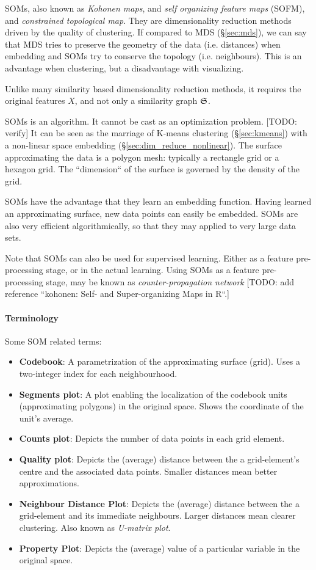 SOMs, also known as \emph{Kohonen maps}, and \emph{self organizing feature maps} (SOFM), and \emph{constrained topological map}. 
They are dimensionality reduction methods driven by the quality of clustering.
If compared to MDS (\S\ref{sec:mds}), we can say that MDS tries to preserve the geometry of the data (i.e. distances) when embedding and SOMs try to conserve the topology (i.e. neighbours).
This is an advantage when clustering, but a disadvantage with visualizing. 

Unlike many similarity based dimensionality reduction methods, it requires the original features $X$, and not only a similarity graph $\mathfrak{S}$. 

SOMs is an algorithm. It cannot be cast as an optimization problem. [TODO: verify]
It can be seen as the marriage of K-means clustering (\S\ref{sec:kmeans}) with a non-linear space embedding (\S\ref{sec:dim_reduce_nonlinear}). 
The surface approximating the data is a polygon mesh: typically a rectangle grid or a hexagon grid.
The ``dimension`` of the surface is governed by the density of the grid.

SOMs have the advantage that they learn an embedding function. Having learned an approximating surface, new data points can easily be embedded.
SOMs are also very efficient algorithmically, so that they may applied to very large data sets.

Note that SOMs can also be used for supervised learning. Either as a feature pre-processing stage, or in the actual learning.
Using SOMs as a feature pre-processing stage, may be known as \emph{counter-propagation network} [TODO: add reference ``kohonen: Self- and Super-organizing Maps in R``.]


\paragraph{Terminology}
Some SOM related terms:
\begin{itemize}
\item \textbf{Codebook}: A parametrization of the approximating surface (grid). Uses a two-integer index for each neighbourhood.
\item \textbf{Segments plot}: A plot enabling the localization of the codebook units (approximating polygons) in the original space. Shows the coordinate of the unit's average.
\item \textbf{Counts plot}: Depicts the number of data points in each grid element.
\item \textbf{Quality plot}: Depicts the (average) distance between the a grid-element's centre and the associated data points. Smaller distances mean better approximations.
\item \textbf{Neighbour Distance Plot}: Depicts the (average) distance between the a grid-element and its immediate neighbours. Larger distances mean clearer clustering. Also known as \emph{U-matrix plot}.
\item \textbf{Property Plot}: Depicts the (average) value of a particular variable in the original space.

\end{itemize}

